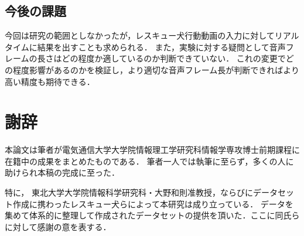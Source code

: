 \section{今後の課題}
今回は研究の範囲としなかったが，レスキュー犬行動動画の入力に対してリアルタイムに結果を出すことも求められる．
また，実験に対する疑問として音声フレームの長さはどの程度か適しているのか判断できていない．
これの変更でどの程度影響があるのかを検証し，より適切な音声フレーム長が判断できればより高い精度も期待できる．

%


% 
% 

\chapter*{謝辞}
本論文は筆者が電気通信大学大学院情報理工学研究科情報学専攻博士前期課程に在籍中の成果をまとめたものである．
筆者一人では執筆に至らず，多くの人に助けられ本稿の完成に至った．

特に，
東北大学大学院情報科学研究科・大野和則准教授，ならびにデータセット作成に携わったレスキュー犬らによって本研究は成り立っている．
データを集めて体系的に整理して作成されたデータセットの提供を頂いた．ここに同氏らに対して感謝の意を表する．







